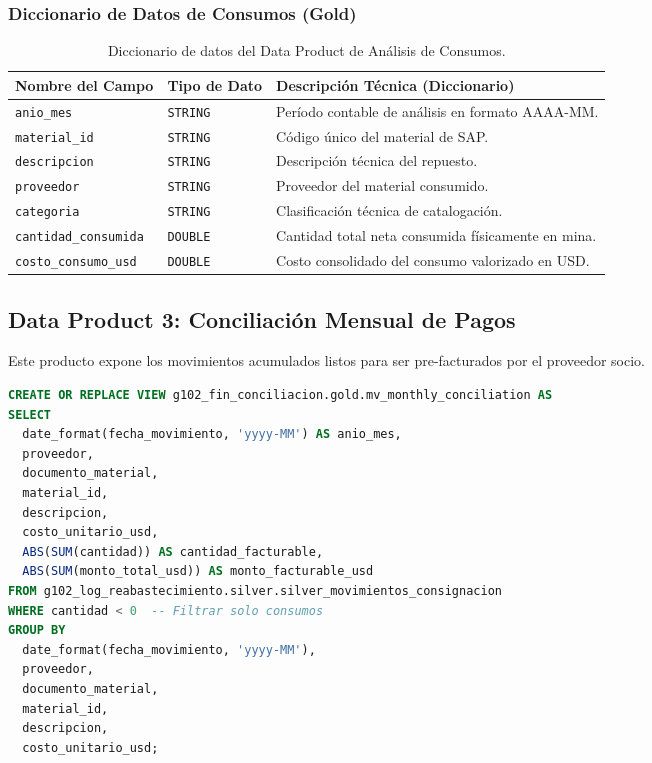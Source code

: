 \documentclass[11pt,a4paper]{article}
\begin{document}
\subsubsection{Diccionario de Datos de Consumos (Gold)}
\begin{table}[h]
    \centering
    \footnotesize
    \begin{tabular}{lll}
        \toprule
        \textbf{Nombre del Campo} & \textbf{Tipo de Dato} & \textbf{Descripción Técnica (Diccionario)} \\
        \midrule
        \texttt{anio\_mes} & \texttt{STRING} & Período contable de análisis en formato AAAA-MM. \\
        \texttt{material\_id} & \texttt{STRING} & Código único del material de SAP. \\
        \texttt{descripcion} & \texttt{STRING} & Descripción técnica del repuesto. \\
        \texttt{proveedor} & \texttt{STRING} & Proveedor del material consumido. \\
        \texttt{categoria} & \texttt{STRING} & Clasificación técnica de catalogación. \\
        \texttt{cantidad\_consumida} & \texttt{DOUBLE} & Cantidad total neta consumida físicamente en mina. \\
        \texttt{costo\_consumo\_usd} & \texttt{DOUBLE} & Costo consolidado del consumo valorizado en USD. \\
        \bottomrule
    \end{tabular}
    \caption{Diccionario de datos del Data Product de Análisis de Consumos.}
\end{table}

\subsection{Data Product 3: Conciliación Mensual de Pagos}
Este producto expone los movimientos acumulados listos para ser pre-facturados por el proveedor socio.

\begin{lstlisting}[language=SQL, caption=DDL de Creación de Conciliación de Pagos]
CREATE OR REPLACE VIEW g102_fin_conciliacion.gold.mv_monthly_conciliation AS
SELECT 
  date_format(fecha_movimiento, 'yyyy-MM') AS anio_mes, 
  proveedor, 
  documento_material, 
  material_id, 
  descripcion, 
  costo_unitario_usd,
  ABS(SUM(cantidad)) AS cantidad_facturable, 
  ABS(SUM(monto_total_usd)) AS monto_facturable_usd
FROM g102_log_reabastecimiento.silver.silver_movimientos_consignacion
WHERE cantidad < 0  -- Filtrar solo consumos
GROUP BY 
  date_format(fecha_movimiento, 'yyyy-MM'), 
  proveedor, 
  documento_material, 
  material_id, 
  descripcion, 
  costo_unitario_usd;
\end{lstlisting}
\end{document}
